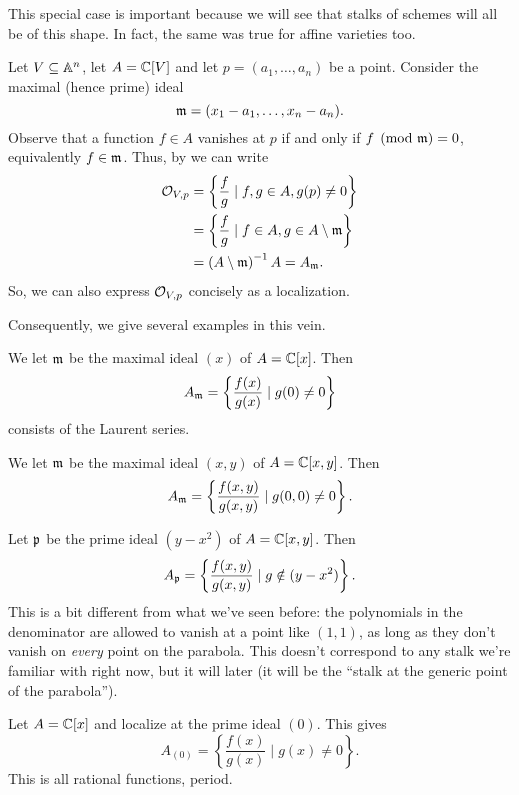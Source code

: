 This special case is important because we will see that
stalks of schemes will all be of this shape.
In fact, the same was true for affine varieties too.
\begin{example}
	Let $V \subseteq \mathbb A^n$, let $A = \mathbb C[V]$
	and let $p = (a_1, \dots, a_n)$ be a point.
	Consider the maximal (hence prime) ideal
	\[ \mathfrak m = (x_1 - a_1, \dots, x_n - a_n). \]
	Observe that a function $f \in A$ vanishes at $p$
	if and only if $f \pmod{\mathfrak m} = 0$, equivalently $f \in \mathfrak m$.
	Thus, by  we can write
	\begin{align*}
		\mathcal O_{V,p} &= \left\{ \frac{f}{g} \mid f,g \in A, g(p) \neq 0 \right\} \\
		&= \left\{ \frac{f}{g} \mid f \in A, g \in A \setminus \mathfrak m \right\} \\
		&= \left( A \setminus \mathfrak m \right)^{-1} A = A_\mathfrak m.
	\end{align*}
	So, we can also express $\mathcal O_{V,p}$ concisely as a localization.
\end{example}
Consequently, we give several examples in this vein.

\begin{example}
	\listhack
	\begin{enumerate}[(a)]
		\ii We let $\mathfrak m$ be the maximal ideal $(x)$ of $A = \mathbb C[x]$.
		Then \[ A_\mathfrak m = \left\{ \frac{f(x)}{g(x)} \mid g(0) \neq 0 \right\} \]
		consists of the Laurent series.

		\ii We let $\mathfrak m$ be the maximal ideal $(x,y)$ of $A = \mathbb C[x,y]$.
		Then \[ A_\mathfrak m = \left\{ \frac{f(x,y)}{g(x,y)} \mid g(0,0) \neq 0 \right\}. \]

		\ii Let $\mathfrak p$ be the prime ideal $(y-x^2)$ of $A = \mathbb C[x,y]$.
		Then
		\[ A_\mathfrak p = \left\{ \frac{f(x,y)}{g(x,y)} \mid g \notin (y-x^2) \right\}. \]
		This is a bit different from what we've seen before:
		the polynomials in the denominator are allowed to vanish
		at a point like $(1,1)$, as long as they don't vanish on
		\emph{every} point on the parabola.
		This doesn't correspond to any stalk we're familiar with right now,
		but it will later
		(it will be the ``stalk at the generic point of the parabola'').

		\ii Let $A = \mathbb C[x]$ and localize at the prime ideal $(0)$.
		This gives \[ A_{(0)} = \left\{ \frac{f(x)}{g(x)} \mid g(x) \neq 0 \right\}. \]
		This is all rational functions, period.
	\end{enumerate}
\end{example}

